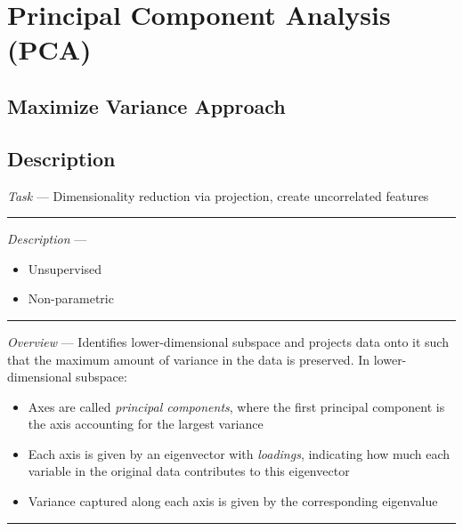 \section{Principal Component Analysis (PCA)}
\subsection*{Maximize Variance Approach}
\subsection*{Description}
\emph{Task} --- Dimensionality reduction via projection, create uncorrelated features

{\color{lightgray}\hrule height 0.001mm}

\emph{Description} --- 
\begin{itemize}
    \item Unsupervised
    \item Non-parametric
\end{itemize}

{\color{lightgray}\hrule height 0.001mm}

\emph{Overview} --- 
Identifies lower-dimensional subspace and projects data onto it such that the maximum amount of variance in the data is preserved. In lower-dimensional subspace:
\begin{itemize}
    \item Axes are called \emph{principal components}, where the first principal component is the axis accounting for the largest variance
    \item Each axis is given by an eigenvector with \emph{loadings}, indicating how much each variable in the original data contributes to this eigenvector
    \item Variance captured along each axis is given by the corresponding eigenvalue
\end{itemize}

{\color{black}\hrule height 0.001mm}

